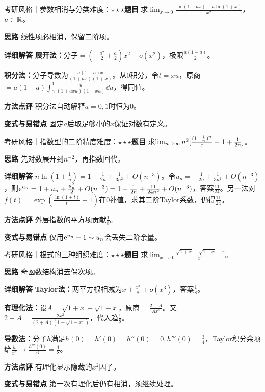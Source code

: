 \begin{example}{考研风格｜参数相消与分类}{难度：$\star\star\star$}\label{deep:ex:limits_source_deep:log}\textbf{题目} 求$\lim_{x\to0}\frac{\ln(1+ax)-a\ln(1+x)}{x^2}$，$a\in\mathbb{R}$。\par\textbf{思路} 线性项必相消，保留二阶项。\par\textbf{详细解答} \textbf{展开法：}分子$=(-\frac{a^2}{2}+\frac{a}{2})x^2+o(x^2)$，极限$\frac{a(1-a)}{2}$。\par\textbf{积分法：}分子导数为$\frac{a(1-a)x}{(1+ax)(1+x)}$。从0积分，令$t=xu$，原商$=a(1-a)\int_0^1\frac{u}{(1+axu)(1+xu)}\dd u$，得同值。\par\textbf{方法点评} 积分法自动解释$a=0,1$时恒为0。\par\textbf{变式与易错点} 固定$a$后取足够小的$x$保证对数有定义。\end{example}

\begin{example}{考研风格｜指数型的二阶精度}{难度：$\star\star\star$}\label{deep:ex:limits_source_deep:exponential}\textbf{题目} 求$\lim_{n\to\infty}n^2[\frac{(1+\frac{1}{n})^n}{\mathrm{e}}-1+\frac{1}{2n}]$。\par\textbf{思路} 先对数展开到$n^{-2}$，再指数回代。\par\textbf{详细解答} $n\ln(1+\frac{1}{n})=1-\frac1{2n}+\frac1{3n^2}+O(n^{-3})$。令$u_n=-\frac{1}{2n}+\frac{1}{3n^2}+O(n^{-3})$，则$\mathrm{e}^{u_n}=1+u_n+\frac{u_n^2}{2}+O(n^{-3})=1-\frac1{2n}+\frac{11}{24n^2}+O(n^{-3})$，答案$\frac{11}{24}$。另一法对$f(t)=\exp(\frac{\ln(1+t)}{t}-1)$在0补值，求其二阶Taylor系数，仍得$\frac{11}{24}$。\par\textbf{方法点评} 外层指数的平方项贡献$\frac{1}{8}$。\par\textbf{变式与易错点} 仅用$\mathrm{e}^{u_n}-1\sim u_n$会丢失二阶余量。\end{example}

\begin{example}{考研风格｜根式的三种组织}{难度：$\star\star\star$}\label{deep:ex:limits_source_deep:rationalization}\textbf{题目} 求$\lim_{x\to0}\frac{\sqrt{1+x}-\sqrt{1-x}-x}{x^3}$。\par\textbf{思路} 奇函数结构消去偶次项。\par\textbf{详细解答} \textbf{Taylor法：}两平方根相减为$x+\frac{x^3}{8}+o(x^3)$，答案$\frac{1}{8}$。\par\textbf{有理化法：}设$A=\sqrt{1+x}+\sqrt{1-x}$，原商$=\frac{2-A}{Ax^2}$。又$2-A=\frac{2x^2}{(2+A)(1+\sqrt{1-x^2})}$，代入趋$\frac{1}{8}$。\par\textbf{导数法：}分子$h$满足$h(0)=h'(0)=h''(0)=0,h'''(0)=\frac{3}{4}$，Taylor积分余项给$\frac{h}{x^3}\to \frac{h'''(0)}{6}=\frac{1}{8}$。\par\textbf{方法点评} 有理化显示隐藏的$x^2$因子。\par\textbf{变式与易错点} 第一次有理化后仍有相消，须继续处理。\end{example}

